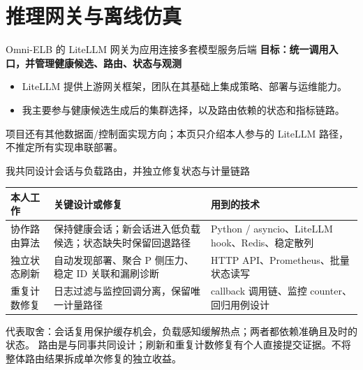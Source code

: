 \documentclass[aspectratio=169,10pt]{beamer}
\newcommand{\src}[1]{\vfill{\fontsize{6.7}{8}\selectfont\color{Muted}#1}\par}
\newcommand{\lead}[1]{{\color{Teal}\large\bfseries #1}\par\medskip}
\begin{document}
\section{推理网关与离线仿真}
\begin{frame}{Omni-ELB 的 LiteLLM 网关为应用连接多套模型服务后端}
\lead{目标：统一调用入口，并管理健康候选、路由、状态与观测}
\begin{center}
\end{center}
\begin{itemize}
\item LiteLLM 提供上游网关框架，团队在其基础上集成策略、部署与运维能力。
\item 我主要参与健康候选生成后的集群选择，以及路由依赖的状态和指标链路。
\end{itemize}
\src{项目还有其他数据面/控制面实现方向；本页只介绍本人参与的 LiteLLM 路径，不推定所有实现串联部署。}
\end{frame}

\begin{frame}{我共同设计会话与负载路由，并独立修复状态与计量链路}
\renewcommand{\arraystretch}{1.55}
\begin{tabularx}{\textwidth}{@{}p{2.6cm}YY@{}}
\toprule 本人工作 & 关键设计或修复 & 用到的技术 \\
\midrule
协作路由算法 & 保持健康会话；新会话进入低负载候选；状态缺失时保留回退路径 & Python / asyncio、LiteLLM hook、Redis、稳定散列 \\
独立状态刷新 & 自动发现部署、聚合 P 侧压力、稳定 ID 关联和漏刷诊断 & HTTP API、Prometheus、批量状态读写 \\
重复计数修复 & 日志过滤与监控回调分离，保留唯一计量路径 & callback 调用链、监控 counter、回归用例设计 \\
\bottomrule
\end{tabularx}
\medskip
代表取舍：会话复用保护缓存机会，负载感知缓解热点；两者都依赖准确且及时的状态。
\src{路由是与同事共同设计；刷新和重复计数修复有个人直接提交证据。不将整体路由结果拆成单次修复的独立收益。}
\end{frame}
\end{document}
